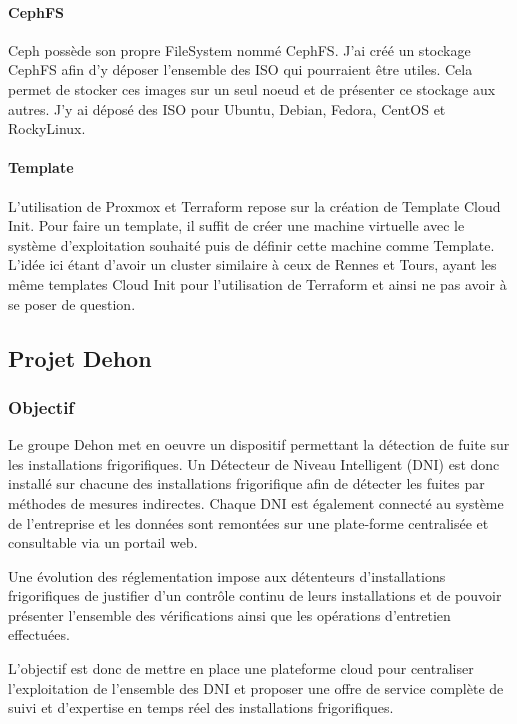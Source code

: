 \documentclass[12pt]{article}
\begin{document}
\paragraph{CephFS}
Ceph possède son propre FileSystem nommé CephFS.
J'ai créé un stockage CephFS afin d'y déposer l'ensemble des ISO qui pourraient être utiles.
Cela permet de stocker ces images sur un seul noeud et de présenter ce stockage aux autres.
J'y ai déposé des ISO pour Ubuntu, Debian, Fedora, CentOS et RockyLinux.

\paragraph{Template}
L'utilisation de Proxmox et Terraform repose sur la création de Template Cloud Init.
Pour faire un template, il suffit de créer une machine virtuelle avec le système d'exploitation souhaité puis de définir cette machine comme Template.
L'idée ici étant d'avoir un cluster similaire à ceux de Rennes et Tours, ayant les même templates Cloud Init pour l'utilisation de Terraform et ainsi ne pas avoir à se poser de question.

\newpage
\subsection{Projet Dehon} \label{dehon}
\subsubsection{Objectif}

Le groupe Dehon met en oeuvre un dispositif permettant la détection de fuite sur les installations frigorifiques. 
Un Détecteur de Niveau Intelligent (DNI) est donc installé sur chacune des installations frigorifique afin de détecter les fuites par méthodes de mesures indirectes.
Chaque DNI est également connecté au système de l'entreprise et les données sont remontées sur une plate-forme centralisée et consultable via un portail web. 

Une évolution des réglementation impose aux détenteurs d'installations frigorifiques de justifier d'un contrôle continu de leurs installations et de pouvoir présenter l'ensemble des vérifications ainsi que les opérations d'entretien effectuées.

L'objectif est donc de mettre en place une plateforme cloud pour centraliser l'exploitation de l'ensemble des DNI et proposer une offre de service complète de suivi et d'expertise en temps réel des installations frigorifiques.
\end{document}
